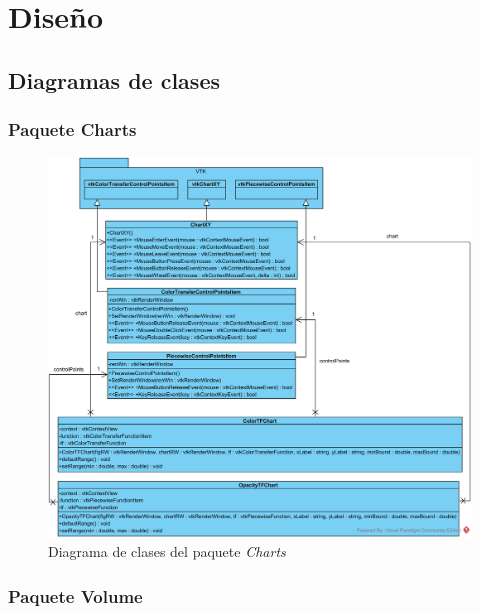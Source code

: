 \chapter{Diseño}

\section{Diagramas de clases}

\subsection{Paquete Charts}

\begin{figure}[H]
	\centering
	\includegraphics[width=12.5cm]{imagenes/diagramas/charts}
	\caption{Diagrama de clases del paquete \textit{Charts}}
	\label{fig:diagrama_clases_charts}
\end{figure}

\subsection{Paquete Volume}

